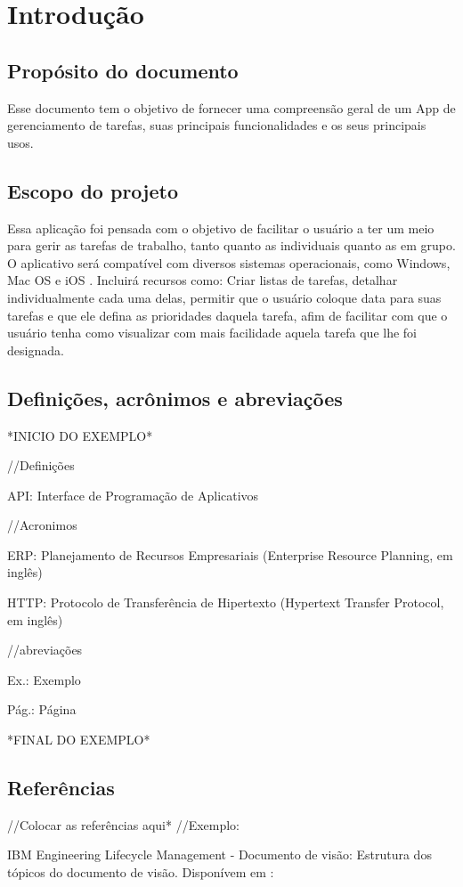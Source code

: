 \chapter{Introdução}
\section{Propósito do documento}
Esse documento tem o objetivo de fornecer uma compreensão geral de um App de gerenciamento de tarefas, suas principais funcionalidades e os seus principais usos.
\section{Escopo do projeto}
Essa aplicação foi pensada com o objetivo de facilitar o usuário a ter um meio para gerir as tarefas de trabalho, tanto quanto as individuais quanto as em grupo. O aplicativo será compatível com diversos sistemas operacionais, como Windows, Mac OS e iOS . Incluirá recursos como: Criar listas de tarefas, detalhar individualmente cada uma delas, permitir que o usuário coloque data para suas tarefas e que ele defina as prioridades daquela tarefa, afim de facilitar com que o usuário tenha como visualizar com mais facilidade aquela tarefa que lhe foi designada.
\section{Definições, acrônimos e abreviações}
*INICIO DO EXEMPLO*

//Definições

API: Interface de Programação de Aplicativos

//Acronimos

ERP: Planejamento de Recursos Empresariais (Enterprise Resource Planning, em inglês)

HTTP: Protocolo de Transferência de Hipertexto (Hypertext Transfer Protocol, em inglês)

//abreviações

Ex.: Exemplo

Pág.: Página

*FINAL DO EXEMPLO*
\section{Referências}
//Colocar as referências aqui*
//Exemplo:

IBM Engineering Lifecycle Management - Documento de visão: Estrutura dos tópicos do documento de visão.
Disponívem em : 


